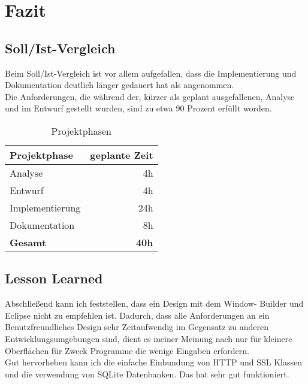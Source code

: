 \section{Fazit}
\subsection{Soll/Ist-Vergleich}
Beim Soll/Ist-Vergleich ist vor allem aufgefallen, dass die Implementierung und Dokumentation deutlich länger gedauert hat als angenommen.\\
Die Anforderungen, die während der, kürzer als geplant ausgefallenen, Analyse und im Entwurf gestellt wurden, sind zu etwa 90 Prozent erfüllt worden.\\


\begin{center}
\begin{table} [htb] %
\centering
\begin{tabular}{  l  r  }
\hline
\rowcolor{cyan}\textbf{Projektphase}&\textbf{geplante Zeit}\\
\hline
Analyse&4h\\
\rowcolor{lightgray}Entwurf&4h\\
Implementierung&24h\\
\rowcolor{lightgray}Dokumentation&8h\\
\hline
\textbf{Gesamt}&\textbf{40h}\\
\hline
\end{tabular}
\caption{Projektphasen}
\label{tab:Projektphasen}
\end{table}
\end{center}


\subsection{Lesson Learned}

Abschließend kann ich feststellen, dass ein Design mit dem Window- Builder und Eclipse nicht zu empfehlen ist. Dadurch, dass alle Anforderungen an ein Benutzfreundliches Design sehr Zeitaufwendig im Gegensatz zu anderen Entwicklungsumgebungen sind, dient es meiner Meinung nach nur für kleinere Oberflächen für Zweck Programme die wenige Eingaben erfordern.\\
Gut hervorheben kann ich die einfache Einbundung von HTTP und SSL Klassen und die verwendung von SQLite Datenbanken. Das hat sehr gut funktioniert.
